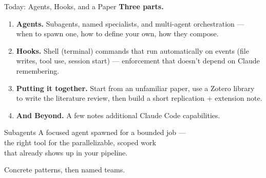 \documentclass[aspectratio=169, 11pt]{beamer}
\begin{document}

\begin{frame}{Today: Agents, Hooks, and a Paper}
  \textbf{Three parts.}

  \vspace{0.7em}
  \begin{enumerate}
    \item \textbf{Agents.} Subagents, named specialists, and multi-agent orchestration --- when to spawn one, how to define your own, how they compose.

    \vspace{0.5em}
    \item \textbf{Hooks.} Shell (terminal) commands that run automatically on events (file writes, tool use, session start) --- enforcement that doesn't depend on Claude remembering.

    \vspace{0.5em}
    \item \textbf{Putting it together.} Start from an unfamiliar paper, use a Zotero library to write the literature review, then build a short replication + extension note.
    
    \vspace{0.5em}
    \item \textbf{And Beyond.} A few notes additional Claude Code capabilities.
  \end{enumerate}

  \vspace{0.8em}
\end{frame}


\begin{frame}{Subagents}
  \centering
  \vspace{2em}
  {\Large A focused agent spawned for a bounded job ---\\[0.3em]
  the right tool for the parallelizable, scoped work\\[0.3em]
  that already shows up in your pipeline.}

  \vspace{2em}
  Concrete patterns, then named teams.
\end{frame}
\end{document}

